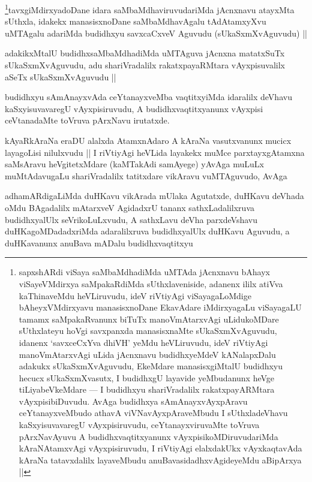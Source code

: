 \begin{artha}
\footnote[1]{sapxshARdi viSaya saMbaMdhadiMda uMTAda jAcnxnavu bAhayx viSayeVMdirxya saMpakaRdiMda sUthxlaveniside, adanenx ililx atiVva kaThinaveMdu heVLiruvudu, ideV riVtiyAgi viSayagaLoMdige bAheyxVMdirxyavu manasisxnoDane EkavAdare iMdirxyagaLu viSayagaLU tamamx saMpakaRvanunx biTuTx manoVmAtarxvAgi uLidukoMDare sUthxlateyu hoVgi savxpanxda manasisxnaMte sUkaSxmXvAguvudu, idanenx `savxceCxYva dhiVH' yeMdu heVLiruvudu, ideV riVtiyAgi manoVmAtarxvAgi uLida jAcnxnavu budidhxyeMdeV kANalapxDalu adakukx sUkaSxmXvAguvudu, EkeMdare manasisxgiMtalU budidhxyu hecucx sUkaSxmXvasutx, I budidhxgU layavide yeMbudanunx heVge tiLiyabeVkeMdare --- I budidhxyu shariVradalilx rakatxpayARMtara vAyxpisibiDuvudu. AvAga budidhxya sAmAnayxvAyxpAravu ceYtanayxveMbudo athavA viVNavAyxpAraveMbudu I sUthxladeVhavu kaSxyisuvavaregU vAyxpisiruvudu, ceYtanayxviruvaMte toVruva pArxNavAyuvu A budidhxvaqtitxyanunx vAyxpisikoMDiruvudariMda kAraNAtamxvAgi vAyxpisiruvudu, I riVtiyAgi elalxdakUkx vAyxkaqtavAda kAraNa tatavxdalilx layaveMbudu anuBavasidadhxvAgideyeMdu aBipArxya ||}tavxgiMdirxyadoDane idara saMbaMdhaviruvudariMda jAcnxnavu atayxMta sUthxla, idakekx manasisxnoDane saMbaMdhavAgalu tAdAtamxyXvu uMTAgalu adariMda budidhxyu savxcaCxveV Aguvudu (sUkaSxmXvAguvudu) ||
\end{artha}

\begin{artha}
adakikxMtalU budidhxsaMbaMdhadiMda uMTAguva jAcnxna matatxSuTx sUkaSxmXvAguvudu, adu shariVradalilx rakatxpayaRMtara vAyxpisuvalilx aSeTx sUkaSxmXvAguvudu ||
\end{artha}

\begin{artha}
budidhxyu sAmAnayxvAda ceYtanayxveMba vaqtitxyiMda idaralilx deVhavu kaSxyisuvavaregU vAyxpisiruvudu, A budidhxvaqtitxyanunx vAyxpisi ceVtanadaMte toVruva pArxNavu irutatxde.
\end{artha}

\begin{artha}
kAyaRkAraNa eraDU alalxda AtamxnAdaro A kAraNa vasutxvanunx mucicx layagoLisi nilulxvudu || I riVtiyAgi heVLida layakekx muMce parxtayxgAtamxna saMsAravu heVgitetxMdare (kaMTakAdi samAyege) yAvAga muLuLx muMtAdavugaLu shariVradalilx tatitxdare vikAravu vuMTAguvudo, AvAga
\end{artha}

\begin{artha}
adhamARdigaLiMda duHKavu vikArada mUlaka Agutatxde, duHKavu deVhada oMdu BAgadalilx mAtarxveV AgidadxrU tananx sathxLadalilxruva budidhxyalUlx seVrikoLuLxvudu, A sathxLavu deVha parxdeVshavu duHKagoMDadadxriMda adaralilxruva budidhxyalUlx duHKavu Aguvudu, a duHKavanunx anuBava mADalu budidhxvaqtitxyu
\end{artha}


